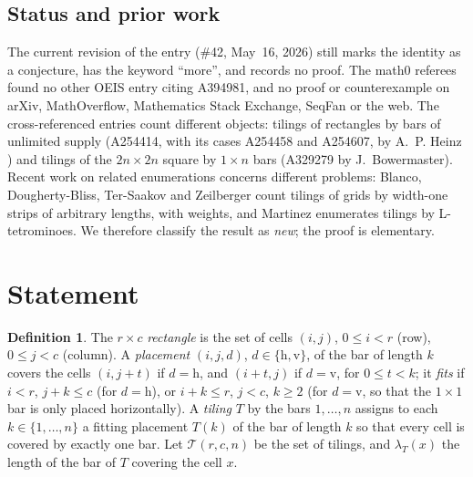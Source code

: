 \documentclass[11pt]{amsart}
\theoremstyle{plain}
\theoremstyle{definition}
\newtheorem{definition}[theorem]{Definition}
\newcommand{\T}{\mathcal{T}}
\begin{document}
\subsection*{Status and prior work}
The current revision of the entry (\#42, May~16, 2026) still marks the identity as a conjecture, has the keyword ``more'', and records no proof. The math0 referees found no other OEIS entry citing A394981, and no proof or counterexample on arXiv, MathOverflow, Mathematics Stack Exchange, SeqFan or the web. The cross-referenced entries count different objects: tilings of rectangles by bars of unlimited supply (A254414, with its cases A254458 and A254607, by A.~P. Heinz \cite{A254414}) and tilings of the $2n\times2n$ square by $1\times n$ bars (A329279 \cite{A329279} by J.~Bowermaster). Recent work on related enumerations concerns different problems: Blanco, Dougherty-Bliss, Ter-Saakov and Zeilberger \cite{BDTZ} count tilings of grids by width-one strips of arbitrary lengths, with weights, and Martinez \cite{Ma} enumerates tilings by L-tetrominoes. We therefore classify the result as \emph{new}; the proof is elementary.

\section{Statement}\label{sec:statement}

\begin{definition}\label{def:tiling}
The $r\times c$ \emph{rectangle} is the set of cells $(i,j)$, $0\le i<r$ (row), $0\le j<c$ (column). A \emph{placement} $(i,j,d)$, $d\in\{\mathrm h,\mathrm v\}$, of the bar of length $k$ covers the cells $(i,j+t)$ if $d=\mathrm h$, and $(i+t,j)$ if $d=\mathrm v$, for $0\le t<k$; it \emph{fits} if $i<r$, $j+k\le c$ (for $d=\mathrm h$), or $i+k\le r$, $j<c$, $k\ge2$ (for $d=\mathrm v$, so that the $1\times1$ bar is only placed horizontally). A \emph{tiling} $T$ by the bars $1,\dots,n$ assigns to each $k\in\{1,\dots,n\}$ a fitting placement $T(k)$ of the bar of length $k$ so that every cell is covered by exactly one bar. Let $\T(r,c,n)$ be the set of tilings, and $\lambda_T(x)$ the length of the bar of $T$ covering the cell $x$.
\end{definition}
\end{document}
